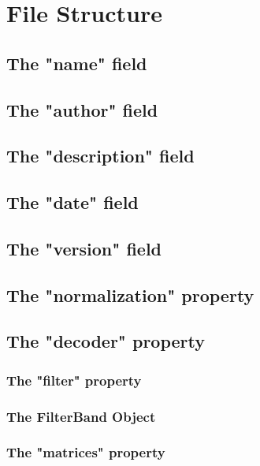 \section[Structure]{File Structure}

\subsection{The "name" field}

\subsection{The "author" field}

\subsection{The "description" field}

\subsection{The "date" field}

\subsection{The "version" field}

\subsection{The "normalization" property}

\subsection{The "decoder" property}

\subsubsection{The "filter" property}
    \subsubsection{The FilterBand Object}

\subsubsection{The "matrices" property}
